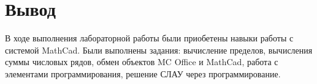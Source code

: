 \section*{Вывод}

В ходе выполнения лабораторной работы были приобетены навыки работы с
системой MathCad.
Были выполнены задания: вычисление пределов, вычисления суммы числовых рядов,
обмен объектов MC Office и MathCad, работа с элементами программирования,
решение СЛАУ через программирование.